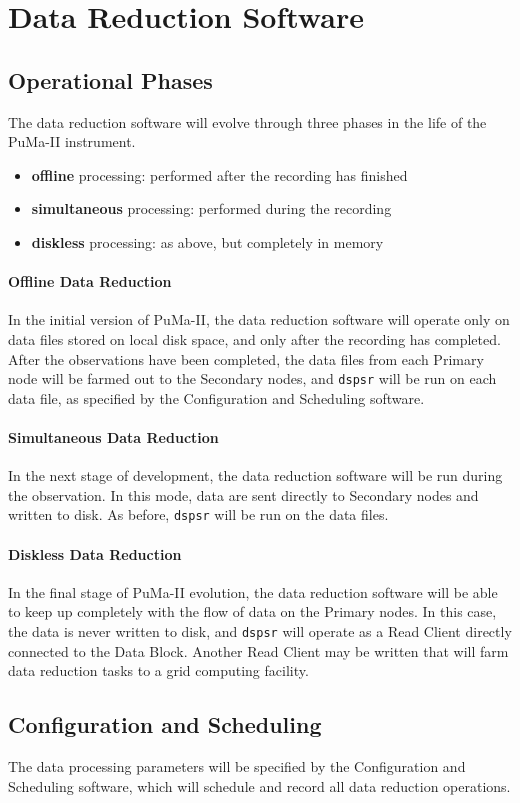 \chapter{Data Reduction Software}

\section{Operational Phases}

The data reduction software will evolve through three phases in the life
of the PuMa-II instrument.

\begin{itemize}
\item {\bf offline} processing: performed after the recording has finished
\item {\bf simultaneous} processing: performed during the recording
\item {\bf diskless} processing: as above, but completely in memory
\end{itemize}

\subsubsection{Offline Data Reduction}

In the initial version of PuMa-II, the data reduction software will
operate only on data files stored on local disk space, and only after
the recording has completed.  After the observations have been
completed, the data files from each Primary node will be farmed out to
the Secondary nodes, and {\tt dspsr} will be run on each data file, as
specified by the Configuration and Scheduling software.

\subsubsection{Simultaneous Data Reduction}

In the next stage of development, the data reduction software will be
run during the observation.  In this mode, data are sent directly to
Secondary nodes and written to disk.  As before, {\tt dspsr} will be
run on the data files.

\subsubsection{Diskless Data Reduction}

In the final stage of PuMa-II evolution, the data reduction software
will be able to keep up completely with the flow of data on the
Primary nodes.  In this case, the data is never written to disk, and
{\tt dspsr} will operate as a Read Client directly connected to the
Data Block.  Another Read Client may be written that will farm data
reduction tasks to a grid computing facility.

\section{Configuration and Scheduling}

The data processing parameters will be specified by the Configuration
and Scheduling software, which will schedule and record all data
reduction operations.
